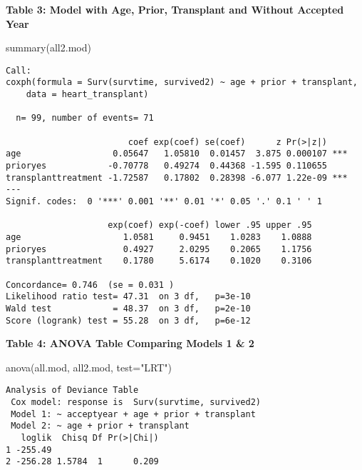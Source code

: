 \documentclass[
  letterpaper,
  DIV=11,
  numbers=noendperiod]{scrreprt}
\newenvironment{Shaded}{\begin{snugshade}}{\end{snugshade}}
\newcommand{\AttributeTok}[1]{\textcolor[rgb]{0.40,0.45,0.13}{#1}}
\newcommand{\FunctionTok}[1]{\textcolor[rgb]{0.28,0.35,0.67}{#1}}
\newcommand{\NormalTok}[1]{\textcolor[rgb]{0.00,0.23,0.31}{#1}}
\newcommand{\StringTok}[1]{\textcolor[rgb]{0.13,0.47,0.30}{#1}}
\begin{document}
\textbf{Table 3: Model with Age, Prior, Transplant and Without Accepted Year}

\begin{Shaded}
\begin{Highlighting}[]
\FunctionTok{summary}\NormalTok{(all2.mod)}
\end{Highlighting}
\end{Shaded}

\begin{verbatim}
Call:
coxph(formula = Surv(survtime, survived2) ~ age + prior + transplant, 
    data = heart_transplant)

  n= 99, number of events= 71 

                        coef exp(coef) se(coef)      z Pr(>|z|)    
age                  0.05647   1.05810  0.01457  3.875 0.000107 ***
prioryes            -0.70778   0.49274  0.44368 -1.595 0.110655    
transplanttreatment -1.72587   0.17802  0.28398 -6.077 1.22e-09 ***
---
Signif. codes:  0 '***' 0.001 '**' 0.01 '*' 0.05 '.' 0.1 ' ' 1

                    exp(coef) exp(-coef) lower .95 upper .95
age                    1.0581     0.9451    1.0283    1.0888
prioryes               0.4927     2.0295    0.2065    1.1756
transplanttreatment    0.1780     5.6174    0.1020    0.3106

Concordance= 0.746  (se = 0.031 )
Likelihood ratio test= 47.31  on 3 df,   p=3e-10
Wald test            = 48.37  on 3 df,   p=2e-10
Score (logrank) test = 55.28  on 3 df,   p=6e-12
\end{verbatim}

\textbf{Table 4: ANOVA Table Comparing Models 1 & 2}

\begin{Shaded}
\begin{Highlighting}[]
\FunctionTok{anova}\NormalTok{(all.mod, all2.mod, }\AttributeTok{test=}\StringTok{"LRT"}\NormalTok{)}
\end{Highlighting}
\end{Shaded}

\begin{verbatim}
Analysis of Deviance Table
 Cox model: response is  Surv(survtime, survived2)
 Model 1: ~ acceptyear + age + prior + transplant
 Model 2: ~ age + prior + transplant
   loglik  Chisq Df Pr(>|Chi|)
1 -255.49                     
2 -256.28 1.5784  1      0.209
\end{verbatim}
\end{document}
